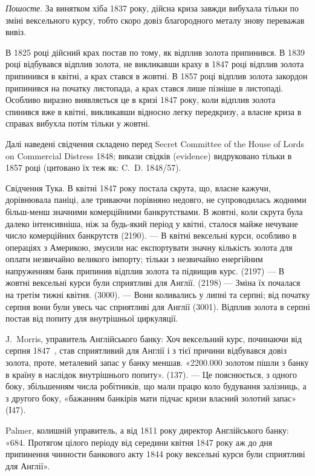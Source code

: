 
\emph{Пошосте}. За винятком хіба 1837 року, дійсна криза завжди вибухала
тільки по зміні вексельного курсу, тобто скоро довіз благородного металу знову
переважав вивіз.

В 1825 році дійсний крах постав по тому, як відплив золота припинився.
В 1839 році відбувався відплив золота, не викликавши краху в 1847 році
відплив золота припинився в квітні, а крах стався в жовтні. В 1857 році відплив
золота закордон припинився на початку листопада, а крах стався лише
пізніше в листопаді. Особливо виразно виявляється це в кризі 1847 року, коли
відплив золота спинився вже в квітні, викликавши відносно легку передкризу,
а власне криза в справах вибухла потім тільки у жовтні.

Далі наведені свідчення складено перед Secret Committee of the House of
Lords on Commercial Distress 1848; викази свідків (evidence) видруковано тільки
в 1857 році (цитовано їх теж як: C.~D. 1848/57).

Свідчення Тука. В квітні 1847 року постала скрута, що, власне кажучи,
дорівнювала паніці, але триваючи порівняно недовго, не супроводилась жодними
більш-менш значними комерційними банкрутствами. В жовтні, коли скрута була
далеко інтенсивніша, ніж за будь-який період у квітні, сталося майже нечуване
число комерційних банкрутств (2190). — В квітні вексельні курси, особливо в операціях
з Америкою, змусили нас експортувати значну кількість золота для оплати
незвичайно великого імпорту; тільки з незвичайно енергійним напруженням банк
припинив відплив золота та підвищив курс. (2197) — В жовтні вексельні курси
були сприятливі для Англії. (2198) — Зміна їх почалася на третім тижні квітня.
(3000). — Вони коливались у липні та серпні; від початку серпня вони були
увесь час сприятливі для Англії (3001). Відплив золота в серпні постав від
попиту для внутрішньої циркуляції.

J.~Morris, управитель Англійського банку: Хоч вексельний курс, починаючи
від серпня 1847~, став сприятливий для Англії і з тієї причини відбувався довіз
золота, проте, металевий запас у банку меншав. «\num{2200.000} золотом пішли
з банку в країну в наслідок внутрішнього попиту». (137). — Це пояснюється,
з одного боку, збільшенням числа робітників, що мали працю коло будування
залізниць, а з другого боку, «бажанням банкірів мати підчас кризи власний
золотий запас» (І47).

Palmer, колишній управитель, а від 1811 року директор Англійського банку:
«684. Протягом цілого періоду від середини квітня 1847 року аж до
дня припинення чинности банкового акту 1844 року вексельні курси були
сприятливі для Англії».

